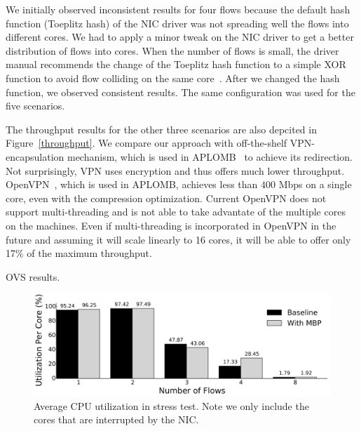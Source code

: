 We initially observed inconsistent results  for four flows because the
default  hash  function (Toeplitz  hash)   of the NIC  driver  was not
spreading  well the flows  into different  cores.   We had to apply  a
minor tweak  on the NIC driver to  get a  better distribution of flows
into cores.  When  the number  of  flows is small, the  driver  manual
recommends the  change of the Toeplitz hash  function to  a simple XOR
function to avoid   flow colliding on the   same core~\cite{mellanox}.
After we changed the   hash function, we observed consistent  results.
The same configuration was used for the five scenarios.

The throughput results for the other three scenarios are also depcited
in Figure~\ref{throughput}. We compare our approach with off-the-shelf
VPN-encapsulation mechanism,  which is used in APLOMB~\cite{Aplomb} to
achieve its redirection.  Not surprisingly,   VPN uses encryption  and
thus offers much lower  throughput.  OpenVPN~\cite{openvpn}, which  is
used in APLOMB, achieves  less than $400$ Mbps on  a single core, even
with the compression  optimization.  Current OpenVPN does  not support
multi-threading and is not  able  to take  advantate of  the  multiple
cores  on  the machines.  Even  if  multi-threading is incorporated in
OpenVPN in the future and assuming it will scale linearly to 16 cores,
it will be able to offer only 17\% of the maximum throughput.

OVS results.


\begin{figure}[ht]
\centering
\includegraphics[width=\linewidth]{figures/CPU.pdf} 
\caption{\small Average CPU utilization in stress test. Note we only include the cores that are interrupted by the NIC.}\label{cpu-utilization}
\end{figure}

